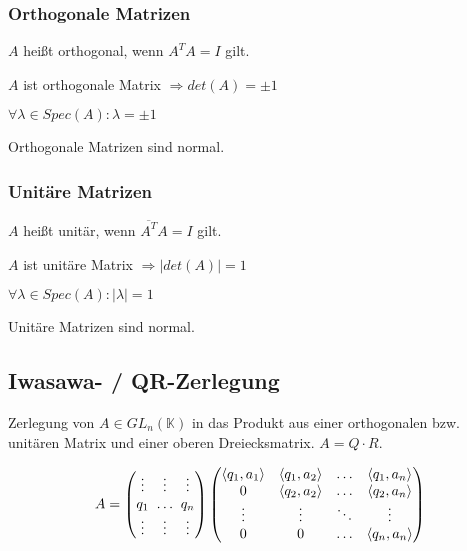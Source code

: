 \subsubsection*{Orthogonale Matrizen}

$A$ heißt orthogonal, wenn $A^TA=I$ gilt.

$A$ ist orthogonale Matrix $\Rightarrow det(A)=\pm 1$

$\forall \lambda \in Spec(A) : \lambda=\pm 1$

Orthogonale Matrizen sind normal.

\subsubsection*{Unitäre Matrizen}

$A$ heißt unitär, wenn $\overline{A^T}A = I$ gilt.

$A$ ist unitäre Matrix $\Rightarrow |det(A)|=1$

$\forall \lambda \in Spec(A) : |\lambda| = 1$

Unitäre Matrizen sind normal.

\subsection*{Iwasawa- / QR-Zerlegung}

Zerlegung von $A \in GL_n(\mathbb{K})$ in das Produkt aus einer orthogonalen bzw. unitären Matrix und einer oberen Dreiecksmatrix. $A = Q \cdot R$.

\vspace*{-5mm}
$$A = \begin{pmatrix}
\vdots & \vdots                           & \vdots \\
q_1    & \hspace{-3mm}\hdots\hspace{-3mm} & q_n \\
\vdots & \vdots                           & \vdots
\end{pmatrix}
\begin{pmatrix}
\langle q_1, a_1 \rangle & \langle q_1, a_2 \rangle & \hdots & \langle q_1, a_n \rangle \\
0                        & \langle q_2, a_2 \rangle & \hdots & \langle q_2, a_n \rangle \\
\vdots                   & \vdots                   & \ddots & \vdots                   \\
0                        & 0                        & \hdots & \langle q_n, a_n \rangle
\end{pmatrix}$$

